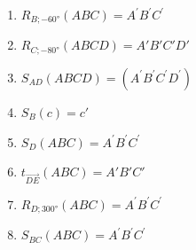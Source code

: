 %
%
  \renewcommand{\figcolor}{Green}
  \begin{enumerate}
    \item $R_{B; \ang{-60}}\left( ABC \right) = A^{'}B^{'}C^{'}$
          \begin{center}
            
          \end{center}
    \item $R_{C; \ang{-80}}\left( ABCD \right) = A'B'C'D'$
          \begin{center}
            
          \end{center}
    \item $S_{AD}(ABCD) = (A^{'}B^{'}C^{'}D^{'})$
          \begin{center}
            
          \end{center}
          \newpage
    \item $S_{B}(c) = c'$
          \begin{center}
            
          \end{center}
    \item $S_{D}\left( ABC \right) = A^{'}B^{'}C^{'}$
          \begin{center}
            
          \end{center}
    \item $t_{\overrightarrow{DE}}\left( ABC \right) = A'B'C'$
          \begin{center}
            
          \end{center}
          \newpage
    \item $R_{D;\ang{300}}\left( ABC \right) = A^{'}B^{'}C^{'}$
          \begin{center}
            
          \end{center}
    \item $S_{BC}\left( ABC \right) = A^{'}B^{'}C^{'}$
          \begin{center}
            
          \end{center}

\end{enumerate}
